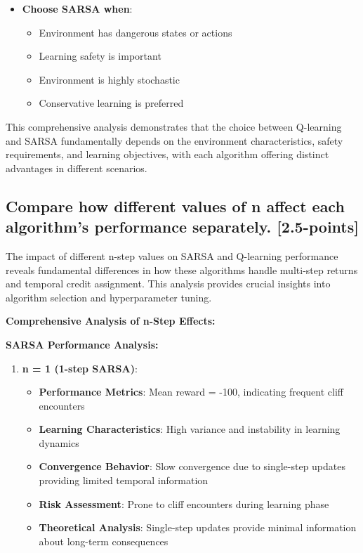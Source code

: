 \documentclass[12pt]{article}
\begin{document}
{{{\begin{itemize}
    \item \textbf{Choose SARSA when}:
    \begin{itemize}
        \item Environment has dangerous states or actions
        \item Learning safety is important
        \item Environment is highly stochastic
        \item Conservative learning is preferred
    \end{itemize}
\end{itemize}

This comprehensive analysis demonstrates that the choice between Q-learning and SARSA fundamentally depends on the environment characteristics, safety requirements, and learning objectives, with each algorithm offering distinct advantages in different scenarios.

\subsection{Compare how different values of n affect each algorithm's performance separately. [2.5-points]}

The impact of different n-step values on SARSA and Q-learning performance reveals fundamental differences in how these algorithms handle multi-step returns and temporal credit assignment. This analysis provides crucial insights into algorithm selection and hyperparameter tuning.

\textbf{Comprehensive Analysis of n-Step Effects:}

\textbf{SARSA Performance Analysis:}

\begin{enumerate}
    \item \textbf{n = 1 (1-step SARSA)}:
    \begin{itemize}
        \item \textbf{Performance Metrics}: Mean reward = -100, indicating frequent cliff encounters
        \item \textbf{Learning Characteristics}: High variance and instability in learning dynamics
        \item \textbf{Convergence Behavior}: Slow convergence due to single-step updates providing limited temporal information
        \item \textbf{Risk Assessment}: Prone to cliff encounters during learning phase
        \item \textbf{Theoretical Analysis}: Single-step updates provide minimal information about long-term consequences
    \end{itemize}
    

\end{enumerate}}}}
\end{document}

